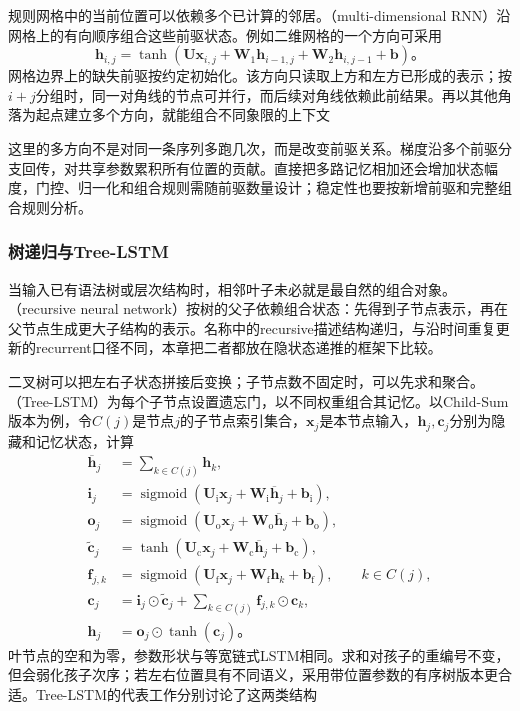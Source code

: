 规则网格中的当前位置可以依赖多个已计算的邻居。（multi-dimensional RNN）沿网格上的有向顺序组合这些前驱状态。例如二维网格的一个方向可采用
\begin{equation}
  \bm{h}_{i,j}=\tanh\!\left(
     \bm{U}\bm{x}_{i,j}+\bm{W}_1\bm{h}_{i-1,j}
      +\bm{W}_2\bm{h}_{i,j-1}+\bm{b}\right)\text{。}
  \label{eq:rnn-multidimensional}
\end{equation}
网格边界上的缺失前驱按约定初始化。该方向只读取上方和左方已形成的表示；按$i+j$分组时，同一对角线的节点可并行，而后续对角线依赖此前结果。再以其他角落为起点建立多个方向，就能组合不同象限的上下文

这里的多方向不是对同一条序列多跑几次，而是改变前驱关系。梯度沿多个前驱分支回传，对共享参数累积所有位置的贡献。直接把多路记忆相加还会增加状态幅度，门控、归一化和组合规则需随前驱数量设计；稳定性也要按新增前驱和完整组合规则分析。

\subsubsection{树递归与Tree-LSTM}
\label{sec:rnn-tree}

当输入已有语法树或层次结构时，相邻叶子未必就是最自然的组合对象。（recursive neural network）按树的父子依赖组合状态：先得到子节点表示，再在父节点生成更大子结构的表示。名称中的recursive描述结构递归，与沿时间重复更新的recurrent口径不同，本章把二者都放在隐状态递推的框架下比较。

二叉树可以把左右子状态拼接后变换；子节点数不固定时，可以先求和聚合。（Tree-LSTM）为每个子节点设置遗忘门，以不同权重组合其记忆。以Child-Sum版本为例，令$C(j)$是节点$j$的子节点索引集合，$\bm{x}_j$是本节点输入，$\bm{h}_j,\bm{c}_j$分别为隐藏和记忆状态，计算
\begin{equation}
  \begin{aligned}
    \overline{\bm{h}}_j&=\sum_{k\in C(j)}\bm{h}_k,\\
    \bm{i}_j&=\operatorname{sigmoid}\!\left(
       \bm{U}_{\mathrm{i}}\bm{x}_j+\bm{W}_{\mathrm{i}}\overline{\bm{h}}_j
       +\bm{b}_{\mathrm{i}}\right),\\
    \bm{o}_j&=\operatorname{sigmoid}\!\left(
       \bm{U}_{\mathrm{o}}\bm{x}_j+\bm{W}_{\mathrm{o}}\overline{\bm{h}}_j
       +\bm{b}_{\mathrm{o}}\right),\\
    \widetilde{\bm{c}}_j&=\tanh\!\left(
       \bm{U}_{\mathrm{c}}\bm{x}_j+\bm{W}_{\mathrm{c}}\overline{\bm{h}}_j
       +\bm{b}_{\mathrm{c}}\right),\\
    \bm{f}_{j,k}&=\operatorname{sigmoid}\!\left(
       \bm{U}_{\mathrm{f}}\bm{x}_j+\bm{W}_{\mathrm{f}}\bm{h}_k
       +\bm{b}_{\mathrm{f}}\right),\qquad k\in C(j),\\
    \bm{c}_j&=\bm{i}_j\odot\widetilde{\bm{c}}_j
        +\sum_{k\in C(j)}\bm{f}_{j,k}\odot\bm{c}_k,\\
    \bm{h}_j&=\bm{o}_j\odot\tanh(\bm{c}_j)\text{。}
  \end{aligned}
  \label{eq:rnn-tree-lstm}
\end{equation}
叶节点的空和为零，参数形状与等宽链式LSTM相同。求和对孩子的重编号不变，但会弱化孩子次序；若左右位置具有不同语义，采用带位置参数的有序树版本更合适。Tree-LSTM的代表工作分别讨论了这两类结构

